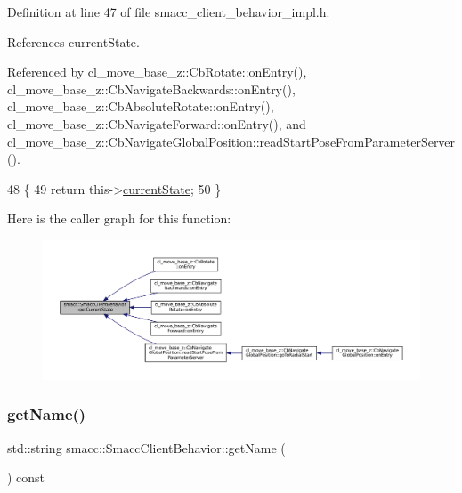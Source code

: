 Definition at line 47 of file smacc\+\_\+client\+\_\+behavior\+\_\+impl.\+h.



References current\+State.



Referenced by cl\+\_\+move\+\_\+base\+\_\+z\+::\+Cb\+Rotate\+::on\+Entry(), cl\+\_\+move\+\_\+base\+\_\+z\+::\+Cb\+Navigate\+Backwards\+::on\+Entry(), cl\+\_\+move\+\_\+base\+\_\+z\+::\+Cb\+Absolute\+Rotate\+::on\+Entry(), cl\+\_\+move\+\_\+base\+\_\+z\+::\+Cb\+Navigate\+Forward\+::on\+Entry(), and cl\+\_\+move\+\_\+base\+\_\+z\+::\+Cb\+Navigate\+Global\+Position\+::read\+Start\+Pose\+From\+Parameter\+Server().


\begin{DoxyCode}
48 \{
49     \textcolor{keywordflow}{return} this->\hyperlink{classsmacc_1_1SmaccClientBehavior_af76fc9b877542ed5caf033f820c107d0}{currentState};
50 \}
\end{DoxyCode}
Here is the caller graph for this function\+:
\nopagebreak
\begin{figure}[H]
\begin{center}
\leavevmode
\includegraphics[width=350pt]{classsmacc_1_1SmaccClientBehavior_abf6773e4dd948f932f11a346dd6e7c2c_icgraph}
\end{center}
\end{figure}
\mbox{\label{classsmacc_1_1SmaccClientBehavior_ada2ec9b296106de2261d13ef22caf81c}} 
\subsubsection{\texorpdfstring{get\+Name()}{getName()}}
{\footnotesize\ttfamily std\+::string smacc\+::\+Smacc\+Client\+Behavior\+::get\+Name (\begin{DoxyParamCaption}{ }\end{DoxyParamCaption}) const}




